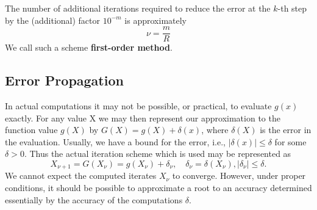 \documentclass[../main.tex]{subfiles}
\begin{document}
The number of additional iterations required to reduce the error at the $k$-th step by the (additional) factor $10^{-m}$ is approximately
\begin{equation}
	\nu = \frac{m}{R}
\end{equation}
We call such a scheme \textbf{first-order method}.

\subsection{Error Propagation}
In actual computations it may not be possible, or practical, to evaluate $g(x)$ exactly. For any value X we may then represent our approximation to the function value $g(X)$ by $G(X) = g(X) + \delta(x)$, where $\delta(X)$ is the error in the evaluation. Usually, we have a bound for the error, i.e., $|\delta(x)| \leq \delta$ for some $\delta > 0$. Thus the actual iteration scheme which is used may be represented as
\begin{equation}
	X_{\nu+1} = G(X_\nu) = g(X_\nu) + \delta_\nu, \quad \delta_\nu = \delta(X_\nu), |\delta_\nu| \leq \delta.
\end{equation}
We cannot expect the computed iterates $X_{\nu}$ to converge. However, under proper conditions, it should be possible to approximate a root to an accuracy determined essentially by the accuracy of the computations $\delta$.
\end{document}
